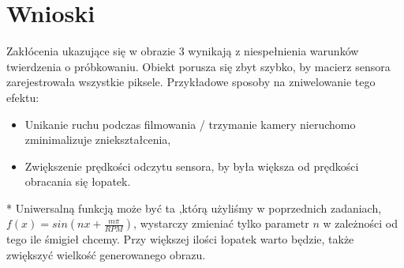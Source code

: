 \documentclass[14pt]{article}
\begin{document}
\newpage
\section{Wnioski}
Zakłócenia ukazujące się w obrazie 3 wynikają z 
niespełnienia warunków twierdzenia o próbkowaniu. Obiekt
porusza się zbyt szybko, by macierz sensora zarejestrowała 
wszystkie piksele. Przykładowe sposoby na zniwelowanie 
tego efektu:
\vspace{0.25cm}
\begin{itemize}
    \item Unikanie ruchu podczas filmowania / trzymanie kamery 
    nieruchomo zminimalizuje zniekształcenia,
    \item Zwiększenie prędkości odczytu sensora, by była 
    większa od prędkości obracania się łopatek.
\end{itemize}

\vspace{0.25cm}
* Uniwersalną funkcją może być ta ,którą użyliśmy w poprzednich zadaniach,
$f(x) = sin(nx + \frac{m\pi}{RPM})$, wystarczy zmieniać tylko
parametr $n$ w zależności od tego ile śmigieł chcemy. Przy większej 
ilości łopatek warto będzie, także zwiększyć wielkość generowanego obrazu.
\end{document}
